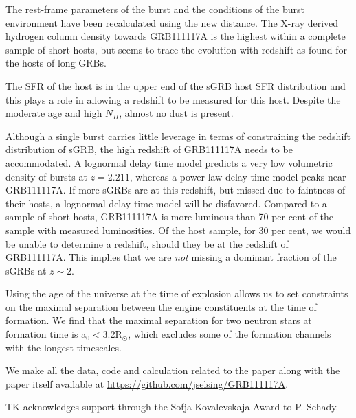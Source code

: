 \documentclass{aa}    %
\begin{document}
The rest-frame parameters of the burst and the conditions of the burst environment have been recalculated using the new distance. The X-ray derived hydrogen column density towards GRB111117A is the highest within a complete sample of short hosts, but seems to trace the evolution with redshift as found for the hosts of long GRBs. 

The SFR of the host is in the upper end of the sGRB host SFR distribution and this plays a role in allowing a redshift to be measured for this host. Despite the moderate age and high $N_H$, almost no dust is present.

Although a single burst carries little leverage in terms of constraining the redshift distribution of sGRB, the high redshift of GRB111117A needs to be accommodated. A lognormal delay time model predicts a very low volumetric density of bursts at $z = 2.211$, whereas a power law delay time model peaks near GRB111117A. If more sGRBs are at this redshift, but missed due to faintness of their hosts, a lognormal delay time model will be disfavored. Compared to a sample of short hosts, GRB111117A is more luminous than 70 per cent of the sample with measured luminosities. Of the host sample, for 30 per cent, we would be unable to determine a redshift, should they be at the redshift of GRB111117A. This implies that we are \textit{not} missing a dominant fraction of the sGRBs at $z \sim 2$.

Using the age of the universe at the time of explosion allows us to set constraints on the maximal separation between the engine constituents at the time of formation. We find that the maximal separation for two neutron stars at formation time is a$_0 < 3.2 $R$_\odot$, which excludes some of the formation channels with the longest timescales. 


We make all the data, code and calculation related to the paper along with the paper itself available at \url{https://github.com/jselsing/GRB111117A}.

\begin{acknowledgements}
TK acknowledges support through the Sofja Kovalevskaja Award to P. Schady.
\end{acknowledgements}




\newpage




\end{document}
